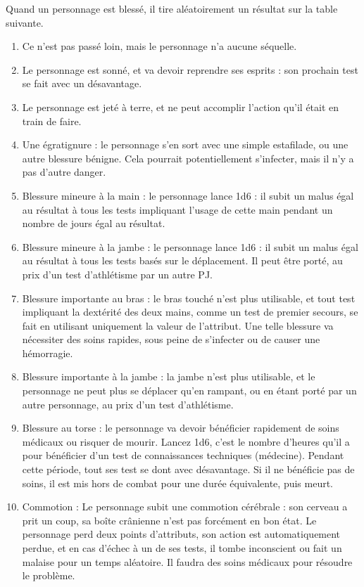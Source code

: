 \documentclass{report}
\begin{document}
\begin{multicols}{2}
Quand un personnage est blessé, il tire aléatoirement un résultat sur la table suivante.

\begin{enumerate}
    \item Ce n'est pas passé loin, mais le personnage n'a aucune séquelle.
    \item Le personnage est sonné, et va devoir reprendre ses esprits : son prochain test se fait avec un désavantage.
    \item Le personnage est jeté à terre, et ne peut accomplir l'action qu'il était en train de faire.
    \item Une égratignure : le personnage s'en sort avec une simple estafilade, ou une autre blessure bénigne. Cela pourrait potentiellement s'infecter, mais il n'y a pas d'autre danger.
    \item Blessure mineure à la main : le personnage lance 1d6 : il subit un malus égal au résultat à tous les tests impliquant l'usage de cette main pendant un nombre de jours égal au résultat.
    \item Blessure mineure à la jambe : le personnage lance 1d6 : il subit un malus égal au résultat à tous les tests basés sur le déplacement. Il peut être porté, au prix d'un test d'athlétisme par un autre PJ.
    \item Blessure importante au bras : le bras touché n'est plus utilisable, et tout test impliquant la dextérité des deux mains, comme un test de premier secours, se fait en utilisant uniquement la valeur de l'attribut. Une telle blessure va nécessiter des soins rapides, sous peine de s'infecter ou de causer une hémorragie.
    \item Blessure importante à la jambe : la jambe n'est plus utilisable, et le personnage ne peut plus se déplacer qu'en rampant, ou en étant porté par un autre personnage, au prix d'un test d'athlétisme.
    \item Blessure au torse : le personnage va devoir bénéficier rapidement de soins médicaux ou risquer de mourir. Lancez 1d6, c'est le nombre d'heures qu'il a pour bénéficier d'un test de connaissances techniques (médecine). Pendant cette période, tout ses test se dont avec désavantage. Si il ne bénéficie pas de soins, il est mis hors de combat pour une durée équivalente, puis meurt.
    \item Commotion : Le personnage subit une commotion cérébrale : son cerveau a prit un coup, sa boîte crânienne n'est pas forcément en bon état. Le personnage perd deux points d'attributs, son action est automatiquement perdue, et en cas d'échec à un de ses tests, il tombe inconscient ou fait un malaise pour un temps aléatoire. Il faudra des soins médicaux pour résoudre le problème. 

\end{enumerate}
\end{multicols}
\end{document}
